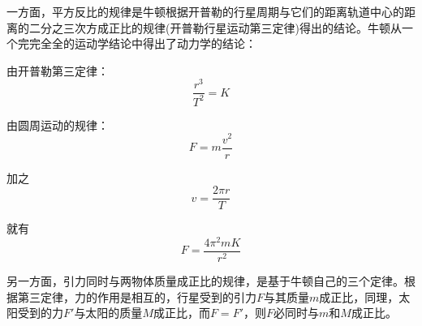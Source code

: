\begin{prove}
    一方面，平方反比的规律是牛顿根据开普勒的行星周期与它们的距离轨道中心的距离的二分之三次方成正比的规律(开普勒行星运动第三定律)得出的结论。牛顿从一个完完全全的运动学结论中得出了动力学的结论：

    由开普勒第三定律：
    \[
        \frac{r^{3}}{T^{2}}=K
    \]

    由圆周运动的规律：
    \[
        F=m\frac{v^{2}}{r}
    \]

    加之
    \[
        v=\frac{2\pi r}{T}
    \]

    就有
    \[F=\frac{4\pi^{2}mK}{r^{2}}\]

    另一方面，引力同时与两物体质量成正比的规律，是基于牛顿自己的三个定律。根据第三定律，力的作用是相互的，行星受到的引力$F$与其质量$m$成正比，同理，太阳受到的力$F'$与太阳的质量$M$成正比，而$F=F'$，则$F$必同时与$m$和$M$成正比。
\end{prove}